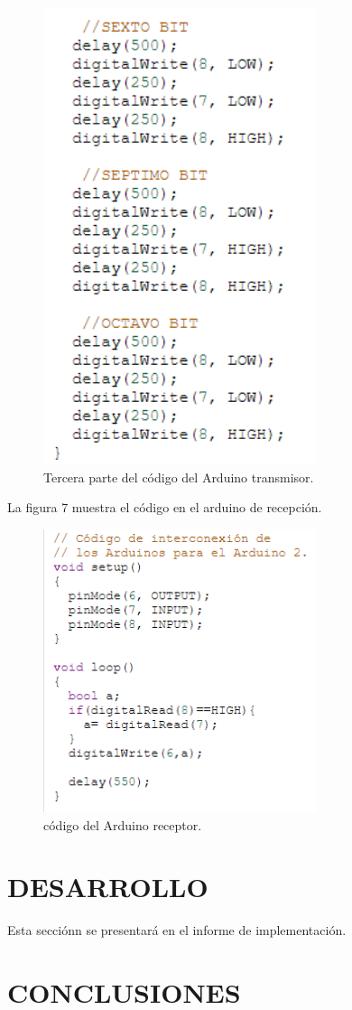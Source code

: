 \documentclass{article}
\begin{document}
\begin{figure}[h]
\includegraphics[width=8cm]{codigo_arduino1_3.PNG}
\centering
\caption{Tercera parte del código del Arduino transmisor.}
\label{fig:codigo_arduino1_3.PNG}
\end{figure}


La figura 7 muestra el código en el arduino de recepción.\\


\begin{figure}[h]
\includegraphics[width=8cm]{codigo_arduino2.PNG}
\centering
\caption{código del Arduino receptor.}
\label{fig:codigo_arduino2.PNG}
\end{figure}


\section{DESARROLLO}

Esta secciónn se presentará en el informe de implementación.


\section{CONCLUSIONES} \label{conclulsion}

    


%

\end{document}
